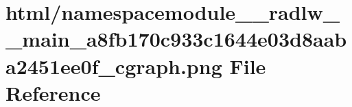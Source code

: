 \hypertarget{namespacemodule____radlw____main__a8fb170c933c1644e03d8aaba2451ee0f__cgraph_8png}{}\section{html/namespacemodule\+\_\+\+\_\+radlw\+\_\+\+\_\+main\+\_\+a8fb170c933c1644e03d8aaba2451ee0f\+\_\+cgraph.png File Reference}
\label{namespacemodule____radlw____main__a8fb170c933c1644e03d8aaba2451ee0f__cgraph_8png}
